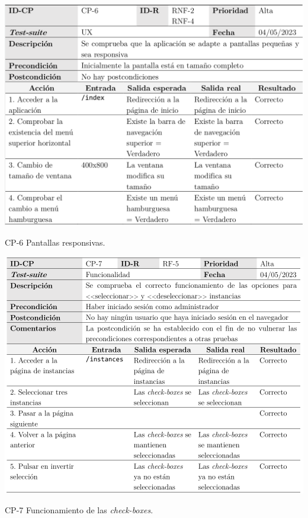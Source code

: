 \begin{table}[p]
	\centering
	\includegraphics[width=\textwidth]{../img/anexos/cp/CP-6}
	\caption{CP-6 Pantallas responsivas.}
	\label{cp:hamburguer-menu}
\end{table}

\begin{table}[p]
	\centering
	\includegraphics[width=\textwidth]{../img/anexos/cp/CP-7}
	\caption{CP-7 Funcionamiento de las \textit{check-boxes}.}
	\label{cp:checkboxes}
\end{table}

